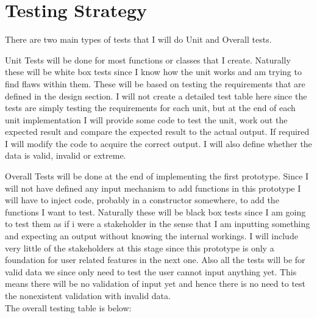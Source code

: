 \documentclass[../../../../main.tex]{subfiles}
\begin{document}
\section{Testing Strategy}
There are two main types of tests that I will do Unit and Overall tests.


Unit Tests will be done for most functions or classes that I create. Naturally these will be white box tests since I  know how the unit works and am trying to find flaws within them. These will be based on testing the requirements that are defined in the design section. I will not create a detailed test table here since the tests are simply testing the requirements for each unit, but at the end of each unit implementation I will provide some code to test the unit, work out the expected result and compare the expected result to the actual output. If required I will modify the code to acquire the correct output. I will also define whether the data is valid, invalid or extreme.


Overall Tests will be done at the end of implementing the first prototype. Since I will not have defined any input mechanism to add functions in this prototype I will have to inject code, probably in a constructor somewhere, to add the functions I want to test. Naturally these will be black box tests since I am going to test them as if i were a stakeholder in the sense that I am inputting something and expecting an output without knowing the internal workings. I will include very little of the stakeholders at this stage since this prototype is only a foundation for user related features in the next one. Also all the tests will be for valid data we since only need to test the user cannot input anything yet. This means there will be no validation of input yet and hence there is no need to test the nonexistent validation with invalid data.\\
The overall testing table is below:
\end{document}
